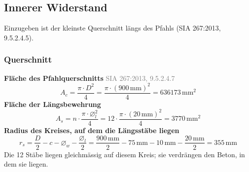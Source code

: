 \documentclass[11pt,a4paper]{article}
\newcommand{\normref}[1]{{\small\textcolor{gray}{#1}}}
\begin{document}
\subsection{Innerer Widerstand}
Einzugeben ist der kleinste Querschnitt längs des Pfahls (SIA 267:2013, 9.5.2.4.5).

\subsubsection{Querschnitt}
\noindent\textbf{Fläche des Pfahlquerschnitts} \hfill \normref{SIA 267:2013, 9.5.2.4.7}
\begin{equation*}
A_c = \frac{\pi \cdot D^{2}}{4} = \frac{\pi \cdot \left(900\,\mathrm{mm}\right)^{2}}{4} = 636173\,\mathrm{mm}^{2}
\end{equation*}
\noindent\textbf{Fläche der Längsbewehrung}
\begin{equation*}
A_s = n \cdot \frac{\pi \cdot \varnothing_l^{2}}{4} = 12 \cdot \frac{\pi \cdot \left(20\,\mathrm{mm}\right)^{2}}{4} = 3770\,\mathrm{mm}^{2}
\end{equation*}
\noindent\textbf{Radius des Kreises, auf dem die Längsstäbe liegen}
\begin{equation*}
r_s = \frac{D}{2} - c - \varnothing_w - \frac{\varnothing_l}{2} = \frac{900\,\mathrm{mm}}{2} - 75\,\mathrm{mm} - 10\,\mathrm{mm} - \frac{20\,\mathrm{mm}}{2} = 355\,\mathrm{mm}
\end{equation*}
Die 12 Stäbe liegen gleichmässig auf diesem Kreis; sie verdrängen den Beton, in dem sie liegen.
\end{document}
